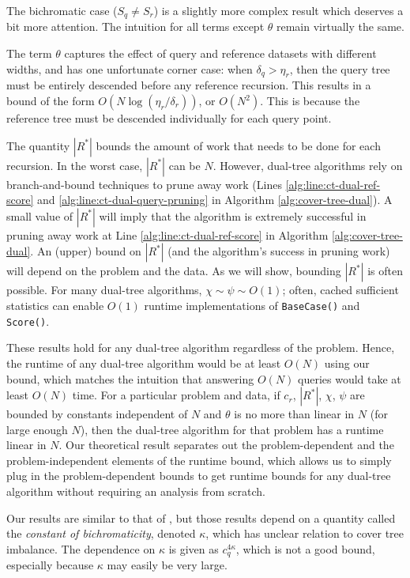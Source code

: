 The bichromatic case ($S_q \ne S_r$) is a slightly more complex result which
deserves a bit more attention.  The intuition for all terms except $\theta$
remain virtually the same.

The term $\theta$ captures the effect of query and reference datasets with
different widths, and has one unfortunate corner case: when $\delta_q > \eta_r$,
then the query tree must be entirely descended before any reference recursion.
This results in a bound of the form $O(N \log (\eta_r / \delta_r))$, or
$O(N^2)$.  This is because the reference tree must be descended individually for
each query point.

The quantity $|R^*|$ bounds the amount of work that needs to be done for each
recursion. In the worst case, $|R^*|$ can be $N$. However,
dual-tree algorithms rely on branch-and-bound techniques to prune away
work (Lines \ref{alg:line:ct-dual-ref-score} and
\ref{alg:line:ct-dual-query-pruning} in Algorithm \ref{alg:cover-tree-dual}). A
small value of $|R^*|$ will imply that the algorithm is extremely successful in
pruning away work at Line \ref{alg:line:ct-dual-ref-score} in Algorithm
\ref{alg:cover-tree-dual}. An (upper) bound on $|R^*|$ (and the algorithm's
success in pruning work) will depend on the problem and the data.  As we will
show, bounding $|R^*|$ is often possible. %
For many dual-tree algorithms, $\chi \sim \psi \sim O(1)$; often, cached
sufficient statistics \citep{moore2000anchors} can enable $O(1)$ runtime
implementations of \texttt{BaseCase()} and \texttt{Score()}.

These results hold for any dual-tree algorithm regardless of the problem. Hence,
the runtime of any dual-tree algorithm
would be at least $O(N)$ using our bound, which matches the intuition that
answering $O(N)$ queries would take at least $O(N)$ time. For a particular
problem and data, if $c_r$, $|R^*|$, $\chi$, $\psi$ are bounded by constants
independent of $N$ and $\theta$ is no more than linear in $N$ (for large enough
$N$), then the dual-tree algorithm for that problem has a runtime linear in $N$.
Our theoretical result separates out the problem-dependent and the
problem-independent elements of the runtime bound, which allows us to simply
plug in the problem-dependent bounds to get runtime bounds for any dual-tree
algorithm without requiring an analysis from scratch.

Our results are similar to that of \citet{ram2009}, but those results depend on
a quantity called the {\it constant of bichromaticity}, denoted $\kappa$, which
has unclear relation to cover tree imbalance.  The dependence on $\kappa$ is
given as $c_q^{4 \kappa}$, which is not a good bound, especially because
$\kappa$ may easily be very large.


